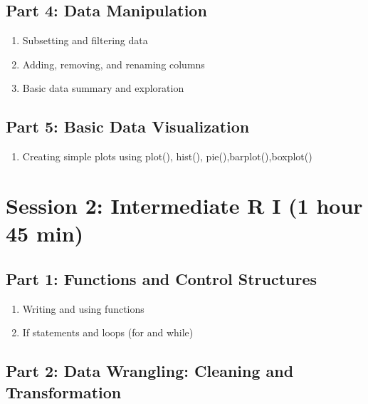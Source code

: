 \documentclass[
]{book}
\providecommand{\tightlist}{%
  \setlength{\itemsep}{0pt}\setlength{\parskip}{0pt}}
\begin{document}
\subsection*{Part 4: Data Manipulation}\label{part-4-data-manipulation}

\begin{enumerate}
\def\labelenumi{\arabic{enumi}.}
\tightlist
\item
  Subsetting and filtering data
\item
  Adding, removing, and renaming columns
\item
  Basic data summary and exploration
\end{enumerate}

\subsection*{Part 5: Basic Data Visualization}\label{part-5-basic-data-visualization}

\begin{enumerate}
\def\labelenumi{\arabic{enumi}.}
\tightlist
\item
  Creating simple plots using plot(), hist(), pie(),barplot(),boxplot()
\end{enumerate}

\section*{Session 2: Intermediate R I (1 hour 45 min)}\label{session-2-intermediate-r-i-1-hour-45-min}

\subsection*{Part 1: Functions and Control Structures}\label{part-1-functions-and-control-structures}

\begin{enumerate}
\def\labelenumi{\arabic{enumi}.}
\tightlist
\item
  Writing and using functions
\item
  If statements and loops (for and while)
\end{enumerate}

\subsection*{Part 2: Data Wrangling: Cleaning and Transformation}\label{part-2-data-wrangling-cleaning-and-transformation}
\end{document}

